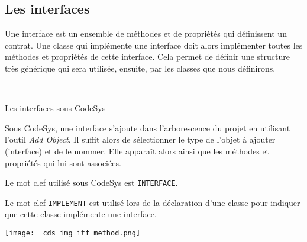 \subsection{Les interfaces}
\label{subsec:interfaces}
Une interface est un ensemble de méthodes et de propriétés qui définissent un contrat. Une classe qui implémente une interface doit alors implémenter toutes les méthodes et propriétés de cette interface. Cela permet de définir une structure très générique qui sera utilisée, ensuite, par les classes que nous définirons. 

\lstDeleteShortInline~
\begin{UPSTIactivite}
    \vspace{5cm}
\end{UPSTIactivite}

\begin{UPSTIinfor}{Les interfaces sous CodeSys}
    \begin{minipage}{.7\linewidth}
        Sous CodeSys, une interface s'ajoute dans l'arborescence du projet en utilisant l'outil \emph{Add Object}. Il suffit alors de sélectionner le type de l'objet à ajouter (interface) et de le nommer. Elle apparaît alors ainsi que les méthodes et propriétés qui lui sont associées. 
        
        Le mot clef utilisé sous CodeSys est \lstinline{INTERFACE}.


        Le mot clef \lstinline{IMPLEMENT} est utilisé lors de la déclaration d'une classe pour indiquer que cette classe implémente une interface.


        
    \end{minipage}
    \hfill
    \begin{minipage}{.25\linewidth}
        \centering
        \texttt{[image: \_cds\_img\_itf\_method.png]}
    \end{minipage}

\end{UPSTIinfor}

